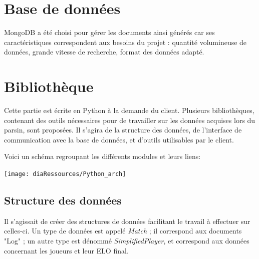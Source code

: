 \section{Base de données}
MongoDB a été choisi pour gérer les documents ainsi générés car ses caractéristiques correspondent aux besoins du projet : quantité volumineuse de données, grande vitesse de recherche, format des données adapté. 

\section{Bibliothèque}
Cette partie est écrite en Python à la demande du client. Plusieurs bibliothèques, contenant des outils nécessaires pour de travailler sur les données acquises lors du parsin, sont proposées. Il s'agira de la structure des données, de l'interface de communication avec la base de données, et d'outils utilisables par le client.

Voici un schéma regroupant les différents modules et leurs liens:

\texttt{[image: diaRessources/Python\_arch]}\\

\subsection{Structure des données}
Il s'agissait de créer des structures de données facilitant le travail à effectuer sur celles-ci. Un type de données est appelé \textit{Match} ; il correspond aux documents "Log" ; un autre type est dénommé \textit{SimplifiedPlayer}, et correspond aux données concernant les joueurs et leur ELO final. 


